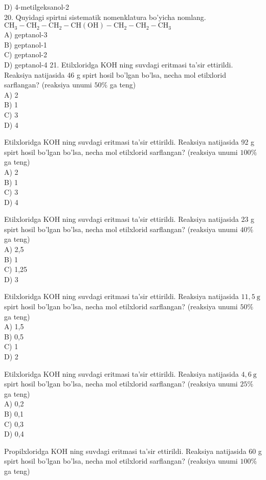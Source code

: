D) 4-metilgeksanol-2\\
20. Quyidagi spirtni sistematik nomenklatura bo'yicha nomlang.\\
$\mathrm{CH}_{3}-\mathrm{CH}_{2}-\mathrm{CH}_{2}-\mathrm{CH}(\mathrm{OH})-\mathrm{CH}_{2}-\mathrm{CH}_{2}-\mathrm{CH}_{3}$\\
A) geptanol-3\\
B) geptanol-1\\
C) geptanol-2\\
D) geptanol-4
21. Etilxloridga KOH ning suvdagi eritmasi ta'sir ettirildi. Reaksiya natijasida 46 g spirt hosil bo'lgan bo'lsa, necha mol etilxlorid sarflangan? (reaksiya unumi $50 \%$ ga teng)\\
A) 2\\
B) 1\\
C) 3\\
D) 4
  \item Etilxloridga KOH ning suvdagi eritmasi ta'sir ettirildi. Reaksiya natijasida 92 g spirt hosil bo'lgan bo'lsa, necha mol etilxlorid sarflangan? (reaksiya unumi $100 \%$ ga teng)\\
A) 2\\
B) 1\\
C) 3\\
D) 4
  \item Etilxloridga KOH ning suvdagi eritmasi ta'sir ettirildi. Reaksiya natijasida 23 g spirt hosil bo'lgan bo'lsa, necha mol etilxlorid sarflangan? (reaksiya unumi $40 \%$ ga teng)\\
A) 2,5\\
B) 1\\
C) 1,25\\
D) 3
  \item Etilxloridga KOH ning suvdagi eritmasi ta'sir ettirildi. Reaksiya natijasida $11,5 \mathrm{~g}$ spirt hosil bo'lgan bo'lsa, necha mol etilxlorid sarflangan? (reaksiya unumi $50 \%$ ga teng)\\
A) 1,5\\
B) 0,5\\
C) 1\\
D) 2
  \item Etilxloridga KOH ning suvdagi eritmasi ta'sir ettirildi. Reaksiya natijasida $4,6 \mathrm{~g}$ spirt hosil bo'lgan bo'lsa, necha mol etilxlorid sarflangan? (reaksiya unumi $25 \%$ ga teng)\\
A) 0,2\\
B) 0,1\\
C) 0,3\\
D) 0,4
  \item Propilxloridga KOH ning suvdagi eritmasi ta'sir ettirildi. Reaksiya natijasida 60 g spirt hosil bo'lgan bo'lsa, necha mol etilxlorid sarflangan? (reaksiya unumi $100 \%$ ga teng)\\
